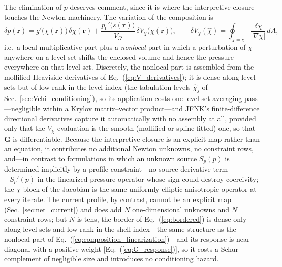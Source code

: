 \documentclass[english]{article}
\newcommand{\br}{\mathbf{r}}
\begin{document}
The elimination of $p$ deserves comment, since it is where the interpretive closure touches the
Newton machinery. The variation of the composition is
\begin{equation}
\delta p(\br)=g'\big(\chi(\br)\big)\,\delta\chi(\br)
+\frac{p_0'\big(s(\br)\big)}{V_\Omega}\,
\delta V_\chi\big(\chi(\br)\big),
\qquad
\delta V_\chi(\hat\chi)=\oint_{\chi=\hat\chi}\frac{\delta\chi}{|\nabla\chi|}\,dA ,
\label{eq:composition_linearization}
\end{equation}
i.e.\ a local multiplicative part plus a \emph{nonlocal} part in which a perturbation of $\chi$
anywhere on a level set shifts the enclosed volume and hence the pressure everywhere on that level
set. Discretely, the nonlocal part is assembled from the mollified-Heaviside derivatives of
Eq.~(\ref{eq:V_derivatives}); it is dense along level sets but of low rank in the level index (the
tabulation levels $\hat\chi_j$ of Sec.~\ref{sec:Vchi_conditioning}), so its application costs one
level-set-averaging pass---negligible within a Krylov matrix--vector product---and JFNK's
finite-difference directional derivatives capture it automatically with no assembly at all,
provided only that the $V_\chi$ evaluation is the smooth (mollified or spline-fitted) one, so that
$\mathbf{G}$ is differentiable. Because the interpretive closure is an explicit map rather than an
equation, it contributes no additional Newton unknowns, no constraint rows, and---in contrast to
formulations in which an unknown source $S_p(p)$ is determined implicitly by a profile
constraint---no source-derivative term $-S_p'(p)$ in the linearized pressure operator whose sign
could destroy coercivity; the $\chi$ block of the Jacobian is the same uniformly elliptic
anisotropic operator at every iterate. The current profile, by contrast, cannot be an explicit map
(Sec.~\ref{sec:net_current}) and does add $N$ one-dimensional unknowns and $N$ constraint rows;
but $N$ is tens, the border of Eq.~(\ref{eq:bordered}) is dense only along level sets and low-rank
in the shell index---the same structure as the nonlocal part of
Eq.~(\ref{eq:composition_linearization})---and its response is near-diagonal with a positive
weight [Eq.~(\ref{eq:G_response})], so it costs a Schur complement of negligible size and
introduces no conditioning hazard.
\end{document}
